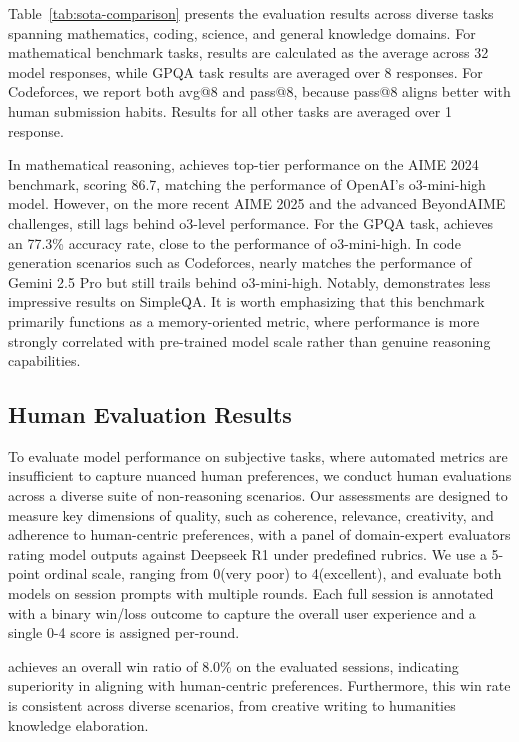 Table~\ref{tab:sota-comparison} presents the evaluation results across diverse tasks spanning mathematics, coding, science, and general knowledge domains. For mathematical benchmark tasks, results are calculated as the average across 32 model responses, while GPQA task results are averaged over 8 responses. For Codeforces, we report both avg@8 and pass@8, because pass@8 aligns better with human submission habits. Results for all other tasks are averaged over 1 response.

In mathematical reasoning, \method achieves top-tier performance on the AIME 2024 benchmark, scoring 86.7, matching the performance of OpenAI's o3-mini-high model. However, on the more recent AIME 2025 and the advanced BeyondAIME challenges, \method still lags behind o3-level performance. For the GPQA task, \method achieves an 77.3\% accuracy rate, close to the performance of o3-mini-high. In code generation scenarios such as Codeforces, \method nearly matches the performance of Gemini 2.5 Pro but still trails behind o3-mini-high. 
Notably, \method demonstrates less impressive results on SimpleQA. It is worth emphasizing that this benchmark primarily functions as a memory-oriented metric, where performance is more strongly correlated with pre-trained model scale rather than genuine reasoning capabilities.

\subsection{Human Evaluation Results}
To evaluate model performance on subjective tasks, where automated metrics are insufficient to capture nuanced human preferences, we conduct human evaluations across a diverse suite of non-reasoning scenarios. Our assessments are designed to measure key dimensions of quality, such as coherence, relevance, creativity, and adherence to human-centric preferences, with a panel of domain-expert evaluators rating model outputs against Deepseek R1 under predefined rubrics. We use a 5-point ordinal scale, ranging from 0(very poor) to 4(excellent), and evaluate both models on session prompts with multiple rounds. Each full session is annotated with a binary win/loss outcome to capture the overall user experience and a single 0-4 score is assigned per-round.

\method achieves an overall win ratio of 8.0\% on the evaluated sessions, indicating superiority in aligning with human-centric preferences. Furthermore, this win rate is consistent across diverse scenarios, from creative writing to humanities knowledge elaboration.


